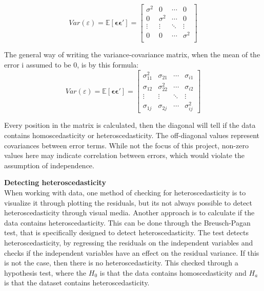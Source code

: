 	
\begin{equation}
Var(\varepsilon) = \mathbb{E}[\boldsymbol{\epsilon} \boldsymbol{\epsilon}'] = 
\left[
\begin{array}{cccc}
	\sigma^2 & 0        & \cdots & 0 \\
	0        & \sigma^2 & \cdots & 0 \\
	\vdots   & \vdots   & \ddots & \vdots \\
	0        & 0        & \cdots & \sigma^2 \\
\end{array}
\right]
\end{equation}


The general way of writing the variance-covariance matrix, when the mean of the error i assumed to be $0$, is by this formula:
\begin{equation}
Var(\varepsilon) = \mathbb{E}[\boldsymbol{\epsilon} \boldsymbol{\epsilon}'] = 
\left[
\begin{array}{cccc}
	\sigma^2_{11} & \sigma_{21} & \cdots & \sigma_{i1} \\
	\sigma_{12} & \sigma^2_{22} & \cdots & \sigma_{i2} \\
	\vdots      & \vdots      & \ddots & \vdots      \\
	\sigma_{1j} & \sigma_{2j} & \cdots & \sigma^2_{ij}
\end{array}
\right]
\end{equation}

Every position in the matrix is calculated, then the diagonal will tell if the data contains homoscedasticity or heteroscedasticity. The off-diagonal values represent covariances between error terms. While not the focus of this project, non-zero values here may indicate correlation between errors, which would violate the assumption of independence. \cite{Heteroscedasticity}

\noindent \textbf{Detecting heteroscedasticity} \\
When working with data, one method of checking for heteroscedasticity is to visualize it through plotting the residuals, but its not always possible to detect heteroscedasticity through visual media. Another approach is to calculate if the data contains heteroscedasticity. This can be done through the Breusch-Pagan test, that is specifically designed to detect heteroscedasticity. The test detects heteroscedasticity, by regressing the residuals on the independent variables and checks if the independent variables have an effect on the residual variance. If this is not the case, then there is no heteroscedasticity. This checked through a hypothesis test, where the $H_0$ is that the data contains homoscedasticity and $H_a$ is that the dataset contains heteroscedasticity. \cite{HomoSce}

